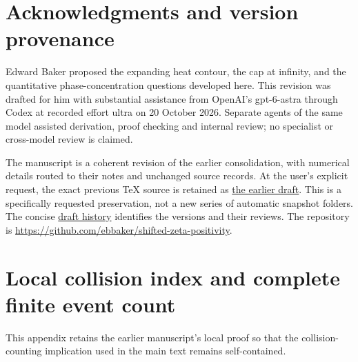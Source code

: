 \documentclass[11pt]{article}
\theoremstyle{definition}
\begin{document}
\section*{Acknowledgments and version provenance}
Edward Baker proposed the expanding heat contour, the cap at infinity,
and the quantitative phase-concentration questions developed here.
This revision was drafted for him with substantial assistance from
OpenAI's gpt-6-astra through Codex at recorded effort ultra on
20 October 2026. Separate agents of the same model assisted derivation,
proof checking and internal review; no specialist or cross-model review
is claimed.

The manuscript is a coherent revision of the earlier consolidation,
with numerical details routed to their notes and unchanged source records.
At the user's explicit request, the exact previous TeX source is retained
as \href{../drafts/20261020_before_phase_concentration.tex}{the earlier draft}.
This is a specifically requested preservation, not a new series of
automatic snapshot folders. The concise
\href{../DRAFT_HISTORY.md}{draft history} identifies the versions and
their reviews. The repository is
\url{https://github.com/ebbaker/shifted-zeta-positivity}.

\appendix
\section{Local collision index and complete finite event count}
\label{app:index}
This appendix retains the earlier manuscript's local proof so that
the collision-counting implication used in the main text remains
self-contained.
\end{document}
